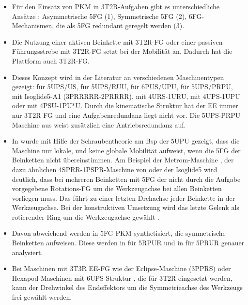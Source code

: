 \documentclass[robotics,article,submit,moreauthors,pdftex]{Definitions/mdpi}
\begin{document}
\begin{itemize}
	\item Für den Einsatz von PKM in 3T2R-Aufgaben gibt es unterschiedliche Ansätze \cite{Tale-MasoulehGos2011}: Asymmetrische 5FG (1), Symmetrische 5FG (2), 6FG-Mechanismen, die als 5FG redundant geregelt werden (3).
	\item Die Nutzung einer aktiven Beinkette mit 3T2R-FG oder einer passiven Führungsstrebe mit 3T2R-FG setzt bei der Mobilität an. Dadurch hat die Plattform auch 3T2R-FG.
	\item Dieses Konzept wird in der Literatur an verschiedenen Maschinentypen gezeigt:
	\cite{WangGos1997} für 5UPS/US, \cite{ZhangGos2001} für 5UPS/RUU, \cite{LiuXuYaoXu2015,WenQinZhaLam2016} für 6PUS/UPU, \cite{ZhengGaoZha2005,GaoSunZha2004} für 5UPS/PRPU, \cite{Gogu2006} mit Isoglide5-A1 (3PRRRRR-2PRRRR), \cite{SchreiberGos2003} mit 4URS-1URU, \cite{MbarekNefCor2005,LinLiYanZha2013} mit 4UPS-1UPU oder \cite{GaoPenZhaLi2006} mit 4PSU-1PU*U. Durch die kinematische Struktur hat der EE immer nur 3T2R FG und eine Aufgabenredundanz liegt nicht vor. Die 5UPS-PRPU Maschine aus \cite{ChengWanZha2008} weist zusätzlich eine Antriebsredundanz auf.
	\item In \cite{HuangLi2002} wurde mit Hilfe der Schraubentheorie am Bsp der 5UPU gezeigt, dass die Maschine nur lokale, und keine globale Mobilität aufweist, wenn die 5FG der Beinketten nicht übereinstimmen. Am Beispiel der Metrom-Maschine \cite{BaerWei2006}, der dazu ähnlichen 4SPRR-1PSPR-Maschine von \cite{AlaghebandMahMilBen2015} oder der Isoglide5 \cite{Gogu2006} wird deutlich, dass bei mehreren Beinketten mit 5FG der nicht durch die Aufgabe vorgegebene Rotations-FG um die Werkzeugachse bei allen Beinketten vorliegen muss. Das führt zu einer letzten Drehachse jeder Beinkette in der Werkzeugachse. Bei der konstruktiven Umsetzung wird das letzte Gelenk als rotierender Ring um die Werkzeugachse gewählt \cite{BaerWei2006,AlaghebandMahMilBen2015}.
	\item Davon abweichend werden in \cite{KongGos2005} 5FG-PKM synthetisiert, die symmetrische Beinketten aufweisen. Diese werden in \cite{Tale-MasoulehGos2011} für 5RPUR und in \cite{Tale-MasoulehSaaGosTag2010} für 5PRUR genauer analysiert.
	\item Bei Maschinen mit 3T3R EE-FG wie der Eclipse-Maschine (3PPRS) \cite{HongKim2000} oder Hexapod-Maschinen mit 6UPS-Struktur \cite{MerletPerDan2000}, die für 3T2R eingesetzt werden, kann der Drehwinkel des Endeffektors um die Symmetrieachse des Werkzeugs frei gewählt werden.
\end{itemize}
\end{document}
